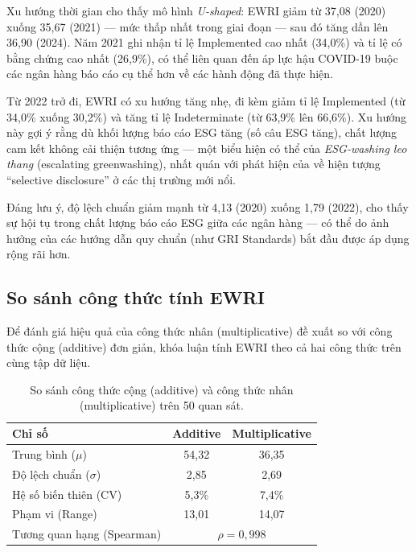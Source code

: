 Xu hướng thời gian cho thấy mô hình \textit{U-shaped}: EWRI giảm từ 37,08 (2020) xuống 35,67 (2021) --- mức thấp nhất trong giai đoạn --- sau đó tăng dần lên 36,90 (2024). Năm 2021 ghi nhận tỉ lệ Implemented cao nhất (34,0\%) và tỉ lệ có bằng chứng cao nhất (26,9\%), có thể liên quan đến áp lực hậu COVID-19 buộc các ngân hàng báo cáo cụ thể hơn về các hành động đã thực hiện.

Từ 2022 trở đi, EWRI có xu hướng tăng nhẹ, đi kèm giảm tỉ lệ Implemented (từ 34,0\% xuống 30,2\%) và tăng tỉ lệ Indeterminate (từ 63,9\% lên 66,6\%). Xu hướng này gợi ý rằng dù khối lượng báo cáo ESG tăng (số câu ESG tăng), chất lượng cam kết không cải thiện tương ứng --- một biểu hiện có thể của \textit{ESG-washing leo thang} (escalating greenwashing), nhất quán với phát hiện của \citet{marquis2016scrutiny} về hiện tượng ``selective disclosure'' ở các thị trường mới nổi.

Đáng lưu ý, độ lệch chuẩn giảm mạnh từ 4,13 (2020) xuống 1,79 (2022), cho thấy sự hội tụ trong chất lượng báo cáo ESG giữa các ngân hàng --- có thể do ảnh hưởng của các hướng dẫn quy chuẩn (như GRI Standards) bắt đầu được áp dụng rộng rãi hơn.


\subsection{So sánh công thức tính EWRI}
\label{subsec:formula_comparison}

Để đánh giá hiệu quả của công thức nhân (multiplicative) đề xuất so với công thức cộng (additive) đơn giản, khóa luận tính EWRI theo cả hai công thức trên cùng tập dữ liệu.

\begin{table}[H]
\centering
\caption{So sánh công thức cộng (additive) và công thức nhân (multiplicative) trên 50 quan sát.}
\label{tab:formula_comparison}
\begin{tabular}{lcc}
\toprule
\textbf{Chỉ số} & \textbf{Additive} & \textbf{Multiplicative} \\
\midrule
Trung bình ($\mu$)      & 54,32 & 36,35 \\
Độ lệch chuẩn ($\sigma$) & 2,85 & 2,69 \\
Hệ số biến thiên (CV)    & 5,3\% & 7,4\% \\
Phạm vi (Range)           & 13,01 & 14,07 \\
Tương quan hạng (Spearman) & \multicolumn{2}{c}{$\rho = 0{,}998$} \\
\bottomrule
\end{tabular}
\end{table}

